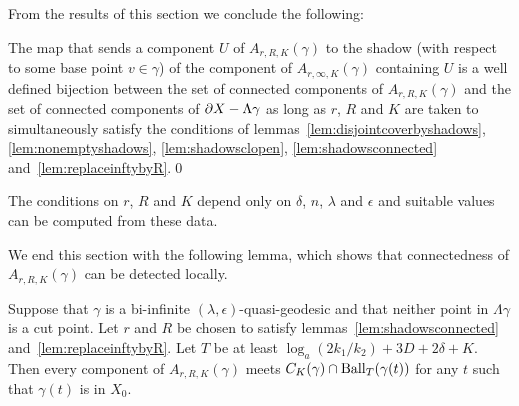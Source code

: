 From the results of this section we conclude the following:

\begin{prop}\label{prop:summaryofannulusresults} The map that sends a component
$U$ of $A_{r, R, K}(\gamma)$ to the shadow (with respect to some base point
$v \in \gamma$) of the component of $A_{r, \infty, K}(\gamma)$ containing $U$
is a well defined bijection between the set of connected components of $A_{r,
R, K}(\gamma)$ and the set of connected components of $\partial X -
\Lambda\gamma$ as long as $r$, $R$ and $K$ are taken to simultaneously
satisfy the conditions of lemmas~\ref{lem:disjointcoverbyshadows},
\ref{lem:nonemptyshadows}, \ref{lem:shadowsclopen}, \ref{lem:shadowsconnected}
and~\ref{lem:replaceinftybyR}.\qed\end{prop}

\begin{rem}\label{rem:rKRcomputable} The conditions on $r$, $R$ and $K$ depend
only on $\delta$, $n$, $\lambda$ and $\epsilon$ and suitable values can be
computed from these data.\end{rem}

We end this section with the following lemma, which shows that connectedness of
$A_{r, R, K}(\gamma)$ can be detected locally.

\begin{lem}\label{lem:Adisconnectedlocally} Suppose that $\gamma$ is a
bi-infinite $(\lambda, \epsilon)$-quasi-geodesic and that neither point in
$\Lambda\gamma$ is a cut point. Let $r$ and $R$ be chosen to satisfy
lemmas~\ref{lem:shadowsconnected} and~\ref{lem:replaceinftybyR}. Let $T$ be
at least $\log_a(2k_1/k_2) + 3D + 2\delta + K$. Then every component of $A_{r, R,
K}(\gamma)$ meets $C_K(\gamma) \cap \operatorname{\mathrm{Ball}}_T(\gamma(t))$ for any $t$
such that $\gamma(t)$ is in $X_0$.  \end{lem}

